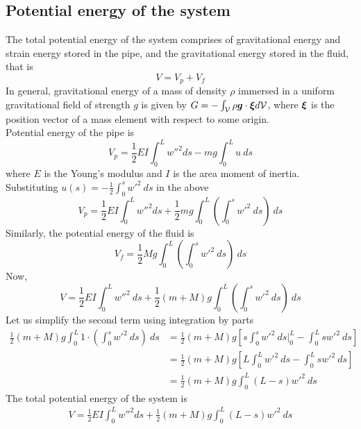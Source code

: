 \documentclass[12pt]{report}
\begin{document}
\subsection{Potential energy of the system} 
The total potential energy of the system comprises of gravitational energy and strain energy stored in the pipe, and the gravitational energy stored in the fluid, that is
$$V = V_p + V_f$$
In general, gravitational energy of a mass of density $\rho$ immersed in a uniform gravitational field of strength $g$ is given by $G = -\int_\mathcal{V} \rho\vb*{g} \cdot \vb*{\xi}d\mathcal{V}$, where $\vb*{\xi}$ is the position vector of a mass element with respect to some origin. \\
Potential energy of the pipe is 
$$V_p =   \frac{1}{2} EI \int_0^L  w''^2 ds - mg\int_0^L u ~ds$$
where $E$ is the Young's modulus and $I$ is the area moment of inertia. \\
Substituting $u(s) = -\frac{1}{2} \int_0^s w'^2 ~ds$ in the above \\
$$V_p =   \frac{1}{2} EI \int_0^L  w''^2 ds + \frac{1}{2}mg\int_0^L \left(\int_0^s w'^2 ~ds\right)~ds$$
Similarly, the potential energy of the fluid is
$$V_f  = \frac{1}{2}Mg\int_0^L \left(\int_0^s w'^2 ~ds\right)~ds$$
Now, 
$$V = \frac{1}{2} EI \int_0^L  w''^2 ~ds + \frac{1}{2}(m + M)g\int_0^L \left(\int_0^s w'^2 ~ds\right)~ds$$
Let us simplify the second term using integration by parts
\begin{align*}
\frac{1}{2}(m + M)g\int_0^L 1\cdot \left(\int_0^s w'^2 ~ds\right)~ds &= \frac{1}{2}(m + M)g \left[s\int_0^s w'^2 ~ds\bigg|_0^L - \int_0^L s w'^2 ~ds \right]  \\
&= \frac{1}{2}(m + M)g\left[L\int_0^L w'^2 ~ds - \int_0^L s w'^2 ~ds \right] \\
&= \frac{1}{2}(m + M)g\int_0^L (L - s) w'^2 ~ds
\end{align*}
The total potential energy of the system is
\begin{align}
V = \frac{1}{2} EI \int_0^L  w''^2 ds + \frac{1}{2}(m + M)g\int_0^L (L - s) w'^2 ~ds \label{eqn:V}
\end{align}
\end{document}
